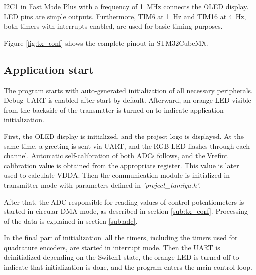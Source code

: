 I2C1 in Fast Mode Plus with a frequency of \SI{1}{\MHz} connects the OLED display. LED pins are simple outputs. Furthermore, TIM6 at \SI{1}{\Hz} and TIM16 at \SI{4}{\Hz}, both timers with interrupts enabled, are used for basic timing purposes.

Figure \ref{fig:tx_conf} shows the complete pinout in STM32CubeMX.

\subsection{Application start}
The program starts with auto-generated initialization of all necessary peripherals. Debug UART is enabled after start by default. Afterward, an orange LED visible from the backside of the transmitter is turned on to indicate application initialization.

First, the OLED display is initialized, and the project logo is displayed. At the same time, a greeting is sent via UART, and the RGB LED flashes through each channel. Automatic self-calibration of both ADCs follows, and the Vrefint calibration value is obtained from the appropriate register. This value is later used to calculate VDDA. Then the communication module is initialized in transmitter mode with parameters defined in \textit{'project\_tamiya.h'}.

After that, the ADC responsible for reading values of control potentiometers is started in circular DMA mode, as described in section \ref{sub:tx_conf}. Processing of the data is explained in section \ref{sub:adc}.

In the final part of initialization, all the timers, including the timers used for quadrature encoders, are started in interrupt mode. Then the UART is deinitialized depending on the Switch1 state, the orange LED is turned off to indicate that initialization is done, and the program enters the main control loop.

